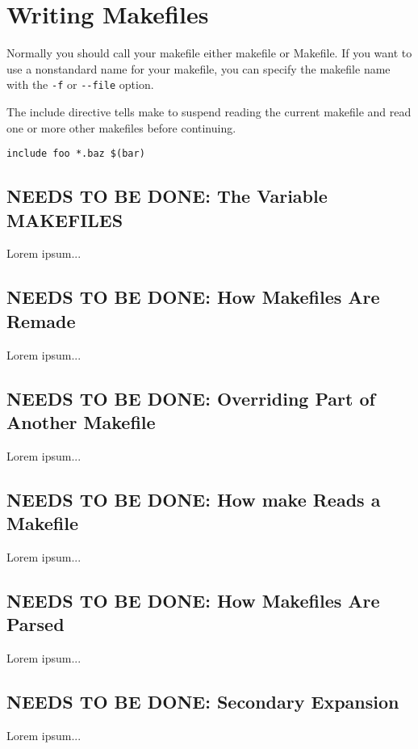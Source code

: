 \section{Writing Makefiles}
Normally you should call your makefile either makefile or Makefile.
If you want to use a nonstandard name for your makefile, you can specify the makefile name with the \texttt{-f} or \texttt{-{}-file} option. 

The include directive tells make to suspend reading the current makefile and read one or more other makefiles before continuing.

\begin{verbatim}
include foo *.baz $(bar)
\end{verbatim}

\color{gray}
\subsection{NEEDS TO BE DONE: The Variable MAKEFILES}
Lorem ipsum...
\color{black}

\color{gray}
\subsection{NEEDS TO BE DONE: How Makefiles Are Remade}
Lorem ipsum...
\color{black}

\color{gray}
\subsection{NEEDS TO BE DONE: Overriding Part of Another Makefile}
Lorem ipsum...
\color{black}

\color{gray}
\subsection{NEEDS TO BE DONE: How make Reads a Makefile}
Lorem ipsum...
\color{black}

\color{gray}
\subsection{NEEDS TO BE DONE: How Makefiles Are Parsed}
Lorem ipsum...
\color{black}

\color{gray}
\subsection{NEEDS TO BE DONE: Secondary Expansion}
Lorem ipsum...
\color{black}